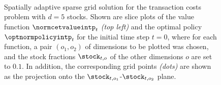 \begin{figure}
  \hfill%
  \hfill%
  \hfill%
  \\[1mm]%
  \hfill%
  \hfill%
  \hfill%
  \\[1mm]%
  \hfill%
  \hfill%
  \hfill%
  \\[1mm]%
  \hfill%
  \hfill%
  \hfill%
  \caption[Sparse grid solution for the five-dimensional TCP]{%
    Spatially adaptive sparse grid solution for the transaction costs problem
    \vspace{-0.15em}%
    with $d = 5$ stocks.
    \vspace{-0.15em}%
    Shown are slice plots of
    the value function $\normcetvalueintp_t$ \emph{(top left)} and
    the optimal policy $\optnormpolicyintp_t$
    for the initial time step $t = 0$,
    where for each function, a pair $(o_1, o_2)$
    of dimensions to be plotted was chosen,
    and the stock fractions $\stock_{t,o}$ of the other dimensions $o$
    are set to $0.1$.
    In addition, the corresponding grid points \emph{(dots)}
    are shown as the projection onto the
    $\stock_{t,o_1}$-$\stock_{t,o_2}$ plane.%
  }%
  \label{fig:financeSolution5DSparseGrid}%
\end{figure}%
